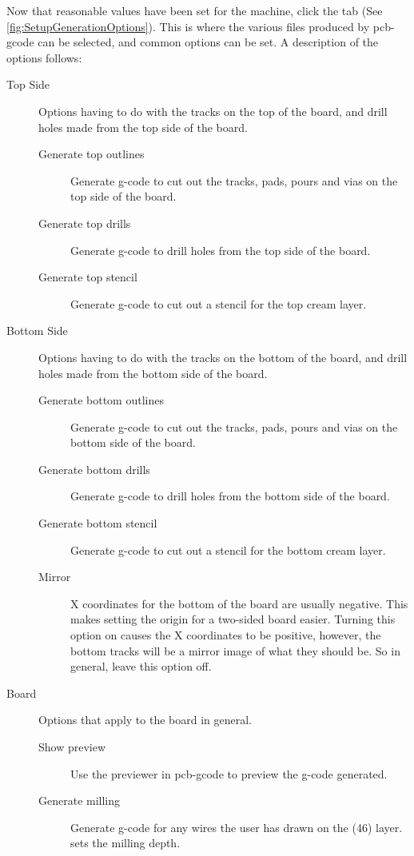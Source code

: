\documentclass[11pt]{book}
\begin{document}
Now that reasonable values have been set for the machine, click the  tab (See \figurename \vref{fig:SetupGenerationOptions}). This is where the various files produced by pcb-gcode can be selected, and common options can be set. A description of the options follows:

\begin{description}
	\item[Top Side] Options having to do with the tracks on the top of the board, and drill holes made from the top side of the board.
	\begin{description}
		\item[Generate top outlines] Generate g-code to cut out the tracks, pads, pours and vias on the top side of the board.
		\item[Generate top drills] Generate g-code to drill holes from the top side of the board.
		\item[Generate top stencil] Generate g-code to cut out a stencil for the top cream layer.
	\end{description}
	\item[Bottom Side] Options having to do with the tracks on the bottom of the board, and drill holes made from the bottom side of the board.
	\begin{description}
		\item[Generate bottom outlines] Generate g-code to cut out the tracks, pads, pours and vias on the bottom side of the board.
		\item[Generate bottom drills] Generate g-code to drill holes from the bottom side of the board.
		\item[Generate bottom stencil] Generate g-code to cut out a stencil for the bottom cream layer.
		\item[Mirror] X coordinates for the bottom of the board are usually negative. This makes setting the origin for a two-sided board easier. Turning this option on causes the X coordinates to be positive, however, the bottom tracks will be a mirror image of what they should be. So in general, leave this option off.
	\end{description}
	\item[Board] Options that apply to the board in general.
	\begin{description}
		\item[Show preview] Use the previewer in pcb-gcode to preview the g-code generated.
		\item[Generate milling] Generate g-code for any wires the user has drawn on the  (46) layer.  sets the milling depth.

\end{description}
\end{description}
\end{document}
